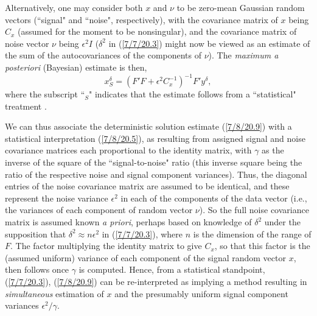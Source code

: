 \documentclass{amsart}
\numberwithin{equation}{section}
\theoremstyle{definition}
\numberwithin{theorem}{section}
\begin{document}
 Alternatively, one may consider both $x$ and $\nu$ to be zero-mean Gaussian random vectors (``signal" and ``noise", respectively), with the covariance matrix of $x$ being $C_x$ (assumed for the moment to be nonsingular), and the covariance matrix of noise vector $\nu$ being $\epsilon^2 I$ ($\delta^2$ in (\ref{7/7/20.3}) might now be viewed as an estimate of the sum of the autocovariances of the components of $\nu$).  The {\it maximum  a posteriori} (Bayesian) estimate  is then, \begin{equation}\label{7/8/20.5} x^\delta_S = (F'F + \epsilon^2 C_x^{-1})^{-1} F'y^\delta,\end{equation}  where the subscript ``$_S$" indicates that the estimate follows from  a ``statistical" treatment \cite{vogel:2002}. 
  
 We can thus associate the deterministic solution estimate (\ref{7/8/20.9}) with a statistical interpretation (\ref{7/8/20.5}), as resulting from assigned signal and noise covariance matrices each proportional to the identity matrix, with $\gamma$ as the inverse of the square of the  ``signal-to-noise" ratio (this inverse square being the ratio of the respective noise and signal component variances).  Thus, the diagonal entries of the noise covariance matrix are assumed to be identical, and these represent the noise variance $\epsilon^2$ in each of the components of the data vector (i.e., the variances of each component of random vector $\nu$).   So the full noise covariance matrix is assumed known {\it a priori}, perhaps based on knowledge of $\delta^2$ under the supposition that $\delta^2 \approx n\epsilon^2$ in (\ref{7/7/20.3}), where $n$ is the dimension of the range of $F$.  The factor multiplying the identity matrix to give $C_x$, so that this factor is the (assumed uniform) variance of each component of the signal random vector $x$, then follows once $\gamma$ is computed.  Hence, from a statistical standpoint,  (\ref{7/7/20.3}), (\ref{7/8/20.9}) can be re-interpreted as implying a method resulting in {\it simultaneous} estimation of $x$ and the presumably uniform signal component variances $\epsilon^2/\gamma$. 
 
\end{document}
